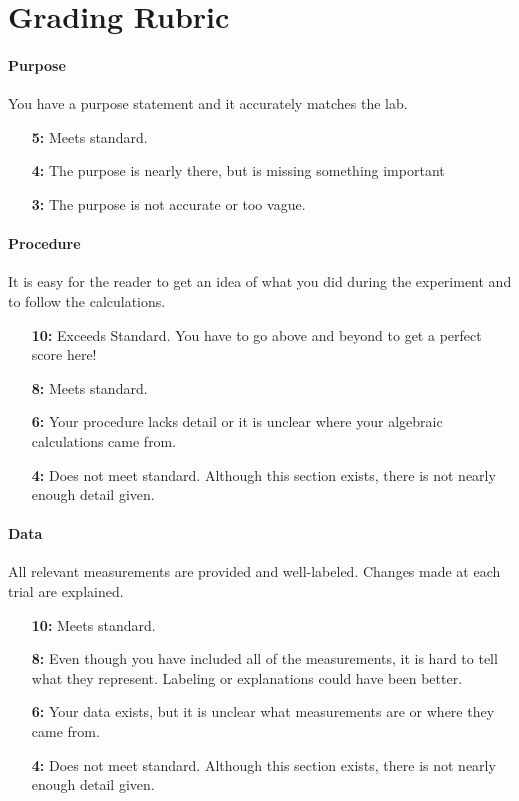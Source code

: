 \documentclass[10pt]{exam}
\begin{document}
\section*{Grading Rubric}


\paragraph{Purpose} You have a purpose statement and it accurately matches the lab.	
\begin{itemize}
  \item[\bf 5:] Meets standard.	
  \item[\bf 4:] The purpose is nearly there, but is missing something important
  \item[\bf 3:] The purpose is not accurate or too vague.
\end{itemize}

\vspace{-0.25em}

\paragraph{Procedure} It is easy for the reader to get an idea of what you did during the experiment and to follow the calculations.
\begin{itemize}
  \item[\bf 10:] Exceeds Standard. You have to go above and beyond to get a perfect score here!
  \item[\bf 8:] Meets standard.
  \item[\bf 6:] Your procedure lacks detail or it is unclear where your algebraic calculations came from.
  \item[\bf 4:] Does not meet standard.  Although this section exists, there is not nearly enough detail given.
\end{itemize}

\vspace{-0.25em}

\paragraph{Data} All relevant measurements are provided and well-labeled.  Changes made at each trial are explained.	
\begin{itemize}
  \item[\bf 10:] Meets standard.	
  \item[\bf 8:] Even though you have included all of the measurements, it is hard to tell what they represent. Labeling or explanations could have been better. 
  \item[\bf 6:] Your data exists, but it is unclear what measurements are or where they came from.
  \item[\bf 4:] Does not meet standard.  Although this section exists, there is not nearly enough detail given.
\end{itemize}
\end{document}

